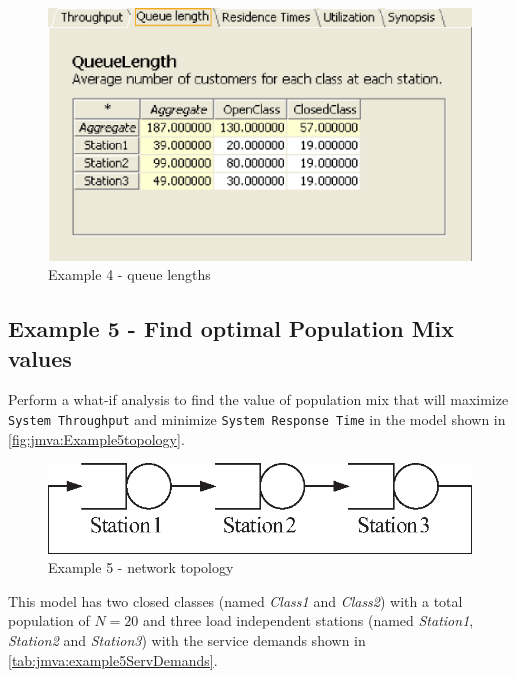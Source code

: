 \begin{figure}[htbp]
    \begin{center}
        \includegraphics[scale=.5]{img/jmva/example4Queue}
    \end{center}
    \caption{Example 4 - queue lengths}
    \label{fig:jmva:example4Queue}
\end{figure}

\subsection{Example 5 - Find optimal Population Mix values}
\label{sec:jmva:example5} Perform a what-if analysis to find the
value of population mix that will maximize \texttt{System
Throughput} and minimize \texttt{System Response Time} in the model
shown in \autoref{fig:jmva:Example5topology}.
\begin{figure}[htbp]
    \begin{center}
        \includegraphics[scale=.65]{img/jmva/example5}
    \end{center}
    \caption{Example 5 - network topology}
    \label{fig:jmva:Example5topology}
\end{figure}
This model has two closed classes (named \emph{Class1} and
\emph{Class2}) with a total population of $N=20$ and three load
independent stations (named \emph{Station1}, \emph{Station2} and
\emph{Station3}) with the service demands shown in
\autoref{tab:jmva:example5ServDemands}.

